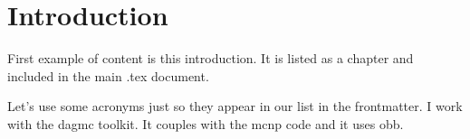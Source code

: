 \documentclass[../../main.tex]{subfiles}
\begin{document}
\chapter{Introduction}

First example of content is this introduction.
It is listed as a chapter and included in the main .tex document.

Let's use some acronyms just so they appear in our list in the frontmatter.
I work with the \gls{dagmc} toolkit.
It couples with the \gls{mcnp} code and it uses \gls{obb}.
\end{document}
